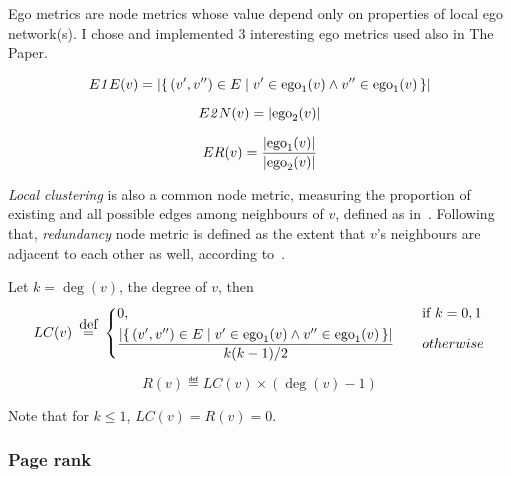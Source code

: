 

Ego metrics are node metrics whose value depend only on properties of local ego network(s).
I chose and implemented 3 interesting ego metrics used also in The Paper.

\begin{definition}
    \[ E\mathit{1}E (v) = \left\lvert \left\{\, (v', v'') \in E \mid  v' \in \operatorname{ego}_1(v) \wedge v'' \in \operatorname{ego}_1(v)  \, \right\} \right\rvert \]
\end{definition}

\begin{definition}
    \[ E\mathit{2}N (v) = \left\lvert \operatorname{ego}_2(v) \right\rvert \]
\end{definition}

\begin{definition}
    \[ ER(v) = \frac{ \left\lvert \operatorname{ego}_1(v) \right\rvert }{ \left\lvert \operatorname{ego}_2(v) \right\rvert } \]
\end{definition}

\textsl{Local clustering} is also a common node metric, measuring the proportion of existing and all possible edges among neighbours of $v$, defined as in~\cite{WattsCollectiveDynamicsSmallworld1998}.
Following that, \textsl{redundancy} node metric is defined as the extent that $v$'s neighbours are adjacent to each other as well, according to~\cite{borgatti1997structural}.
\begin{definition}
    Let $k = \deg(v)$, the degree of $v$, then
    \[
        LC(v) \eqdef
        \begin{dcases}
            0, &\text{if } k = 0,1 \\
            \frac{ \left\lvert \Set{ (v', v'') \in E }{ v' \in \ego_1(v) \wedge v'' \in \ego_1(v) } \right\rvert }{ k (k-1) / 2 } \quad &otherwise
        \end{dcases}
    \]

\end{definition}

\begin{definition}[Redundancy]
    \[ R(v) \eqdef LC (v) \times (\deg(v) - 1) \]

    Note that for $k \leq 1$, $LC(v) = R(v) = 0$.
\end{definition}

\subsubsection{Page rank}

